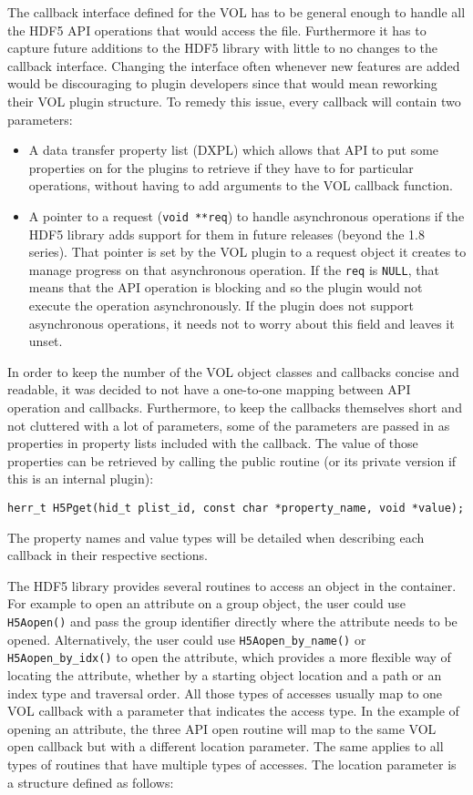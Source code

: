 The callback interface defined for the VOL has to be general enough to
handle all the HDF5 API operations that would access the
file. Furthermore it has to capture future additions to the HDF5
library with little to no changes to the callback interface. Changing
the interface often whenever new features are added would be
discouraging to plugin developers since that would mean reworking
their VOL plugin structure. To remedy this issue, every callback will
contain two parameters:
\begin{itemize}
\item A data transfer property list (DXPL) which allows that API to
  put some properties on for the plugins to retrieve if they have to
  for particular operations, without having to add arguments to the
  VOL callback function.
\item A pointer to a request ({\tt void **req}) to handle asynchronous
  operations if the HDF5 library adds support for them in future
  releases (beyond the 1.8 series). That pointer is set by the VOL
  plugin to a request object it creates to manage progress on that
  asynchronous operation. If the {\tt req} is {\tt NULL}, that means
  that the API operation is blocking and so the plugin would not
  execute the operation asynchronously. If the plugin does not support
  asynchronous operations, it needs not to worry about this field and
  leaves it unset.
\end{itemize}

In order to keep the number of the VOL object classes and callbacks
concise and readable, it was decided to not have a one-to-one mapping
between API operation and callbacks. Furthermore, to keep the
callbacks themselves short and not cluttered with a lot of parameters,
some of the parameters are passed in as properties in property lists
included with the callback. The value of those properties can be
retrieved by calling the public routine (or its private version if
this is an internal plugin): 
\begin{lstlisting}
herr_t H5Pget(hid_t plist_id, const char *property_name, void *value);
\end{lstlisting}
The property names and value types will be detailed when describing
each callback in their respective sections.

The HDF5 library provides several routines to access an object in the
container. For example to open an attribute on a group object, the
user could use {\tt H5Aopen()} and pass the group identifier directly
where the attribute needs to be opened. Alternatively, the user could
use {\tt H5Aopen\_by\_name()} or {\tt H5Aopen\_by\_idx()} to open the
attribute, which provides a more flexible way of locating the
attribute, whether by a starting object location and a path or an
index type and traversal order. All those types of accesses usually
map to one VOL callback with a parameter that indicates the access
type. In the example of opening an attribute, the three API open
routine will map to the same VOL open callback but with a different
location parameter. The same applies to all types of routines that
have multiple types of accesses.  The location parameter is a
structure defined as follows:

